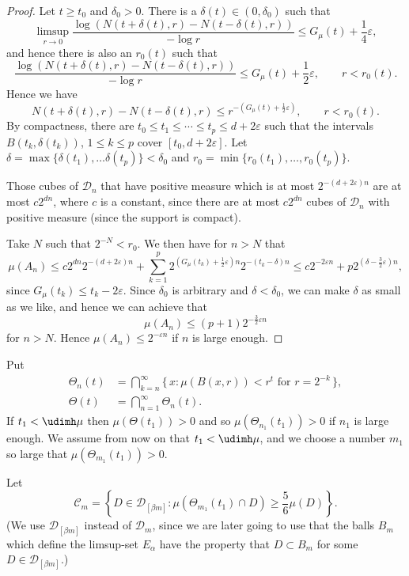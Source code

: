 \begin{proof}
Let $t \geq t_0$ and $\delta_0 > 0$. There is a $\delta (t) \in (0,
\delta_0)$ such that
\[
\limsup_{r \to 0} \frac{\log (N(t + \delta (t), r) - N(t - \delta (t), r))}{- \log r} \leq G_\mu (t) + \frac{1}{4} \varepsilon,
\]
and hence there is also an $r_0 (t)$ such that
\[
\frac{\log (N(t + \delta (t), r) - N(t - \delta (t), r))}{- \log r}
\leq G_\mu (t) + \frac{1}{2} \varepsilon, \qquad r < r_0 (t).
\]
Hence we have
\[
N(t + \delta (t), r) - N(t - \delta (t), r) \leq r^{-(G_\mu (t) +
\frac{1}{2} \varepsilon)}, \qquad r < r_0 (t).
\]
By compactness, there are $t_0 \leq t_1 \leq \cdots \leq t_p \leq d + 2 \varepsilon$ such that the intervals $B(t_k, \delta (t_k))$, $1
\leq k \leq p$ cover $[t_0, d + 2 \varepsilon]$. Let $\delta = \max
\{\delta (t_1), \ldots \delta (t_p) \} < \delta_0$ and $r_0 = \min
\{ r_0 (t_1), \ldots, r_0 (t_p) \}$.

Those cubes of $\mathscr{D}_n$ that have positive measure which is at most $2^{-(d + 2 \varepsilon) n}$ are at most $c 2^{dn}$, where $c$ is a constant, since there are at most $c 2^{dn}$ cubes of $\mathscr{D}_n$ with positive measure (since the support is compact).

Take $N$ such that $2^{-N} < r_0$. We then have for $n > N$ that
\[
\mu (A_n) \leq c 2^{dn} 2^{-(d + 2 \varepsilon) n} + \sum_{k = 1}^p 2^{(G_\mu (t_k) + \frac{1}{2} \varepsilon) n} 2^{-(t_k - \delta) n}
\leq c 2^{- 2 \varepsilon n} + p 2^{(\delta - \frac{3}{2}
\varepsilon)n},
\]
since $G_\mu (t_k) \leq t_k - 2 \varepsilon$. Since $\delta_0$ is arbitrary and $\delta < \delta_0$, we can make $\delta$ as small as we like, and hence we can achieve that
\[
\mu (A_n) \leq (p+1) 2^{- \frac{3}{2} \varepsilon n}
\]
for $n > N$. Hence $\mu (A_n) \leq 2^{- \varepsilon n}$ if $n$ is large enough.
\end{proof}

Put
\begin{align*}
\Theta_n (t) &= \bigcap_{k=n}^\infty \{\, x : \mu (B(x,r)) < r^t
\text{ for } r = 2^{- k} \,\}, \\ \Theta (t) &= \bigcap_{n=1}^\infty
\Theta_n (t).
\end{align*}
If $t_1 < \udimh \mu$ then $\mu (\Theta (t_1)) > 0$ and so $\mu (\Theta_{n_1} (t_1)) > 0$ if $n_1$ is large enough. We assume from now on that $t_1 < \udimh \mu$, and we choose a number $m_1$ so large that $\mu (\Theta_{m_1} (t_1)) > 0$.

Let
\[
\mathscr{C}_m = \left\{ D \in \mathscr{D}_{[\beta m]} : \mu (\Theta_{m_1} (t_1) \cap D) \geq \frac{5}{6} \mu (D) \right\}.
\]
(We use $\mathscr{D}_{[\beta m]}$ instead of $\mathscr{D}_m$, since we are later going to use that the balls $B_m$ which define the limsup-set $E_\alpha$ have the property that $D \subset B_m$ for some $D \in \mathscr{D}_{[\beta m]}$.)

